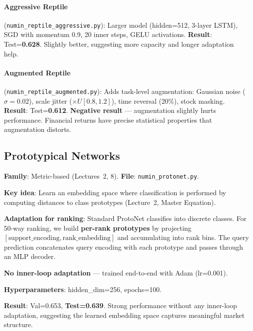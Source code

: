\documentclass[11pt,a4paper]{article}
\begin{document}
\paragraph{Aggressive Reptile} (\texttt{numin\_reptile\_aggressive.py}): Larger model (hidden=512, 3-layer LSTM), SGD with momentum 0.9, 20 inner steps, GELU activations. \textbf{Result}: Test=\textbf{0.628}. Slightly better, suggesting more capacity and longer adaptation help.

\paragraph{Augmented Reptile} (\texttt{numin\_reptile\_augmented.py}): Adds task-level augmentation: Gaussian noise ($\sigma\!=\!0.02$), scale jitter ($\times U[0.8,1.2]$), time reversal (20\%), stock masking. \textbf{Result}: Test=\textbf{0.612}. \textbf{Negative result} --- augmentation slightly hurts performance. Financial returns have precise statistical properties that augmentation distorts.

\subsection{Prototypical Networks~\cite{snell2017}}

\textbf{Family}: Metric-based (Lectures~2, 8). \textbf{File}: \texttt{numin\_protonet.py}.

\textbf{Key idea}: Learn an embedding space where classification is performed by computing distances to class prototypes (Lecture~2, Master Equation).

\textbf{Adaptation for ranking}: Standard ProtoNet classifies into discrete classes. For 50-way ranking, we build \textbf{per-rank prototypes} by projecting $[\text{support\_encoding}, \text{rank\_embedding}]$ and accumulating into rank bins. The query prediction concatenates query encoding with each prototype and passes through an MLP decoder.

\textbf{No inner-loop adaptation} --- trained end-to-end with Adam (lr=0.001).

\textbf{Hyperparameters}: hidden\_dim=256, epochs=100.

\textbf{Result}: Val=0.653, \textbf{Test=0.639}. Strong performance without any inner-loop adaptation, suggesting the learned embedding space captures meaningful market structure.
\end{document}
